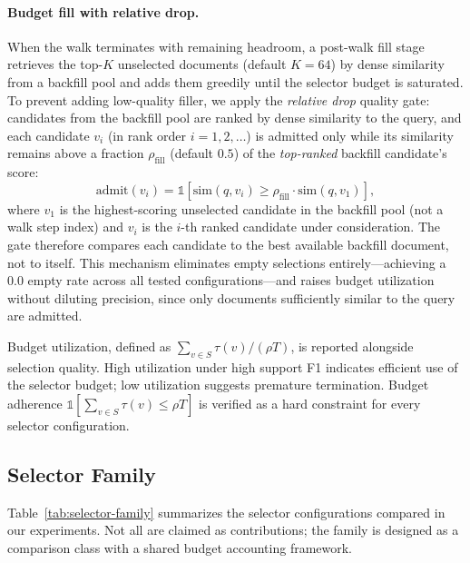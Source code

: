 \paragraph{Budget fill with relative drop.}
When the walk terminates with remaining headroom, a post-walk fill stage retrieves the top-$K$ unselected documents (default $K{=}64$) by dense similarity from a backfill pool and adds them greedily until the selector budget is saturated. To prevent adding low-quality filler, we apply the \emph{relative drop} quality gate: candidates from the backfill pool are ranked by dense similarity to the query, and each candidate $v_i$ (in rank order $i = 1, 2, \ldots$) is admitted only while its similarity remains above a fraction $\rho_{\text{fill}}$ (default $0.5$) of the \emph{top-ranked} backfill candidate's score:
\begin{equation}
\label{eq:budget-fill}
\text{admit}(v_i) = \mathbb{1}\!\left[\text{sim}(q, v_i) \geq \rho_{\text{fill}} \cdot \text{sim}(q, v_1)\right],
\end{equation}
where $v_1$ is the highest-scoring unselected candidate in the backfill pool (not a walk step index) and $v_i$ is the $i$-th ranked candidate under consideration. The gate therefore compares each candidate to the best available backfill document, not to itself. This mechanism eliminates empty selections entirely---achieving a $0.0$ empty rate across all tested configurations---and raises budget utilization without diluting precision, since only documents sufficiently similar to the query are admitted.

Budget utilization, defined as $\sum_{v \in S} \tau(v) / (\rho T)$, is reported alongside selection quality. High utilization under high support F1 indicates efficient use of the selector budget; low utilization suggests premature termination. Budget adherence $\mathbb{1}[\sum_{v \in S} \tau(v) \leq \rho T]$ is verified as a hard constraint for every selector configuration.

\subsection{Selector Family}
\label{sec:method:family}

Table~\ref{tab:selector-family} summarizes the selector configurations compared in our experiments. Not all are claimed as contributions; the family is designed as a comparison class with a shared budget accounting framework.

